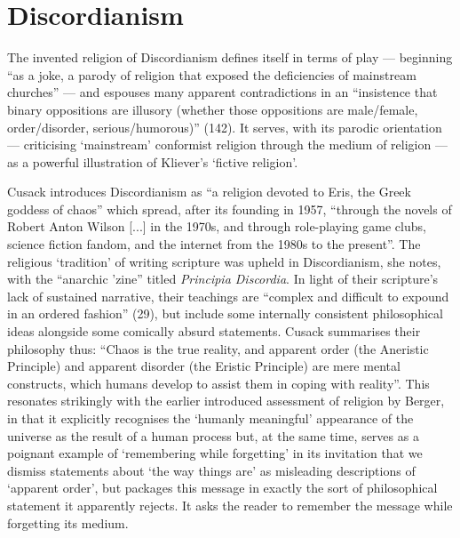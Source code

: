 \documentclass[Draft.tex]{subfiles}
\begin{document}
\section*{Discordianism}
The invented religion of Discordianism defines itself in terms of play
--- beginning ``as a joke, a parody of religion that exposed the deficiencies
of mainstream churches'' \parencite[126]{Cusack11} ---
and espouses many apparent contradictions in an
``insistence that binary oppositions are illusory
(whether those oppositions are male/female, order/disorder,
serious/humorous)'' (142).
It serves, with its parodic orientation --- criticising
`mainstream' conformist religion through the medium of religion ---
as a powerful illustration of Kliever's `fictive religion'.

Cusack \parencite*[27]{Cusack10} introduces Discordianism as
``a religion devoted to Eris, the Greek goddess of chaos''
which spread, after its founding in 1957, ``through
the novels of Robert Anton Wilson [...] in the 1970s,
and through role-playing game clubs, science fiction fandom,
and the internet from the 1980s to the present''.
The religious `tradition' of writing scripture was upheld in Discordianism,
she notes, with the ``anarchic 'zine'' titled \textit{Principia Discordia}.
In light of their scripture's lack of sustained narrative, their teachings
are ``complex and difficult to expound in an ordered fashion'' (29),
but include some internally consistent philosophical ideas
alongside some comically absurd statements.
Cusack \parencite*[128]{Cusack11} summarises their philosophy thus:
``Chaos is the true reality, and apparent order (the Aneristic Principle)
and apparent disorder (the Eristic Principle) are mere mental constructs,
which humans develop to assist them in coping with reality''.
This resonates strikingly with the earlier introduced
assessment of religion by Berger, in that it explicitly recognises the
`humanly meaningful' appearance of the universe as the
result of a human process but, at the same time,
serves as a poignant example of `remembering while forgetting'
in its invitation that we dismiss statements about `the way things are'
as misleading descriptions of `apparent order', but packages this message
in exactly the sort of philosophical statement it apparently rejects.
It asks the reader to remember the message while forgetting its medium.
\end{document}
